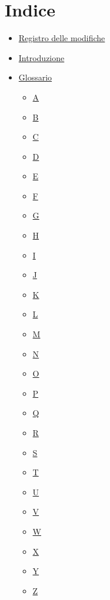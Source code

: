 \documentclass[a4paper,12pt]{article}
\begin{document}
\section*{Indice}
\label{sec:Indice}
\begin{itemize}
    \item \hyperref[sec:Registro delle modifiche]{Registro delle modifiche}
    \item \hyperref[sec:introduzione]{Introduzione}
    \item \hyperref[sec:glossario]{Glossario}
    \begin{itemize}
        \item \hyperref[sec:glossario]{\gls{A}}
        \item \hyperref[sec:glossario]{\gls{B}}
        \item \hyperref[sec:glossario]{\gls{C}}
        \item \hyperref[sec:glossario]{\gls{D}}
        \item \hyperref[sec:glossario]{\gls{E}}
        \item \hyperref[sec:glossario]{\gls{F}}
        \item \hyperref[sec:glossario]{\gls{G}}
        \item \hyperref[sec:glossario]{\gls{H}}
        \item \hyperref[sec:glossario]{\gls{I}}
        \item \hyperref[sec:glossario]{\gls{J}}
        \item \hyperref[sec:glossario]{\gls{K}}
        \item \hyperref[sec:glossario]{\gls{L}}
        \item \hyperref[sec:glossario]{\gls{M}}
        \item \hyperref[sec:glossario]{\gls{N}}
        \item \hyperref[sec:glossario]{\gls{O}}
        \item \hyperref[sec:glossario]{\gls{P}}
        \item \hyperref[sec:glossario]{\gls{Q}}
        \item \hyperref[sec:glossario]{\gls{R}}
        \item \hyperref[sec:glossario]{\gls{S}}
        \item \hyperref[sec:glossario]{\gls{T}}
        \item \hyperref[sec:glossario]{\gls{U}}
        \item \hyperref[sec:glossario]{\gls{V}}
        \item \hyperref[sec:glossario]{\gls{W}}
        \item \hyperref[sec:glossario]{\gls{X}}
        \item \hyperref[sec:glossario]{\gls{Y}}
        \item \hyperref[sec:glossario]{\gls{Z}}
    \end{itemize}
\end{itemize}
\end{document}

